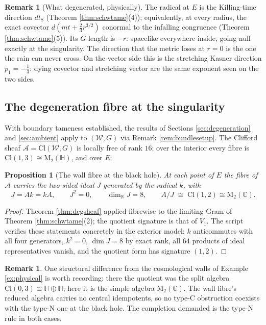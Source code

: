 \documentclass[11pt]{article}
\newtheorem{proposition}[theorem]{Proposition}
\theoremstyle{definition}
\newtheorem{remark}[theorem]{Remark}
\newcommand{\Cl}{\mathrm{Cl}}
\newcommand{\R}{\mathbb{R}}
\newcommand{\HH}{\mathbb{H}}
\newcommand{\Mat}{\mathrm{M}}
\newcommand{\shA}{\mathcal{A}}
\newcommand{\shW}{\mathcal{W}}
\newcommand{\dtS}{dt_{\mathrm{S}}}
\begin{document}
\begin{remark}[What degenerated, physically]\label{rem:schwphysical}
The radical at $E$ is the Killing-time direction $\dtS$ (Theorem \ref{thm:schwtame}(4)); equivalently, at every radius, the exact covector $d(mt + \tfrac23 r^{3/2})$ conormal to the infalling congruence (Theorem \ref{thm:schwtame}(5)). Its $G$-length is $-r$: spacelike everywhere inside, going null exactly at the singularity. The direction that the metric loses at $r = 0$ is the one the rain can never cross. On the vector side this is the stretching Kasner direction $p_1 = -\tfrac13$: dying covector and stretching vector are the same exponent seen on the two sides.
\end{remark}

\subsection{The degeneration fibre at the singularity}\label{subsec:schwfibre}

With boundary tameness established, the results of Sections \ref{sec:degeneration} and \ref{sec:ambient} apply to $(\shW, G)$ via Remark \ref{rem:bundlesetup}. The Clifford sheaf $\shA = \Cl(\shW, G)$ is locally free of rank $16$; over the interior every fibre is $\Cl(1,3) \cong \Mat_2(\HH)$, and over $E$:

\begin{proposition}[The wall fibre at the black hole]\label{prop:schwfibre}
At each point of $E$ the fibre of $\shA$ carries the two-sided ideal $J$ generated by the radical $k$, with
\[
J = A k = k A, \qquad J^2 = 0, \qquad \dim_\R J = 8, \qquad A/J \;\cong\; \Cl(1,2) \cong \Mat_2(\mathbb{C}).
\]
\end{proposition}

\begin{proof}
Theorem \ref{thm:degsheaf} applied fibrewise to the limiting Gram of Theorem \ref{thm:schwtame}(2); the quotient signature is that of $V_1$. The script verifies these statements concretely in the exterior model: $k$ anticommutes with all four generators, $k^2 = 0$, $\dim J = 8$ by exact rank, all $64$ products of ideal representatives vanish, and the quotient form has signature $(1,2)$.
\end{proof}

\begin{remark}
One structural difference from the cosmological walls of Example \ref{ex:physical} is worth recording: there the quotient was the split algebra $\Cl(0,3) \cong \HH \oplus \HH$; here it is the simple algebra $\Mat_2(\mathbb{C})$. The wall fibre's reduced algebra carries no central idempotents, so no type-C obstruction coexists with the type-N one at the black hole. The completion demanded is the type-N rule in both cases.
\end{remark}
\end{document}
